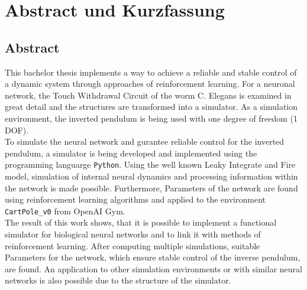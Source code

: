 %
\chapter*{Abstract und Kurzfassung}
%

%
\section*{Abstract}
%
This bachelor thesis implements a way to achieve a reliable and stable control of a dynamic system through approaches of reinforcement learning. For a neuronal network, the \glqq Touch Withdrawal Circuit\grqq{} of the worm C. Elegans is examined in great detail and the structures are transformed into a simulator. As a simulation environment, the inverted pendulum is being used with one degree of freedom (1 DOF).\\
To simulate the neural network and gurantee reliable control for the inverted pendulum, a simulator is being developed and implemented using the programming languarge \texttt{Python}. Using the well known Leaky Integrate and Fire model, simulation of internal neural dynamics and processing information within the network is made possible. Furthermore, Parameters of the network are found using reinforcement learning algorithms and applied to the environment \texttt{CartPole\_v0} from OpenAI Gym.\\
The result of this work shows, that it is possible to implement a functional simulator for biological neural networks and to link it with methods of reinforcement learning. After computing multiple simulations, suitable Parameters for the network, which ensure stable control of the inverse pendulum, are found. An application to other simulation environments or with similar neural networks is also possible due to the structure of the simulator.


%
